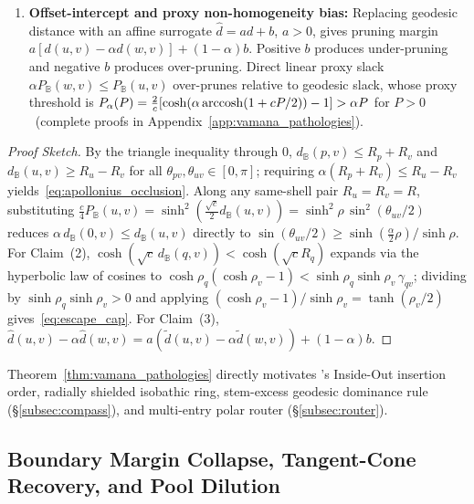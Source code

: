 \begin{theorem}
\begin{enumerate}
  \item \textbf{Offset-intercept and proxy non-homogeneity bias:}
  Replacing geodesic distance with an affine surrogate $\hat{d}=a d+b$, $a>0$, gives pruning margin $a[d(u,v)-\alpha d(w,v)]+(1-\alpha)b$. Positive $b$ produces under-pruning and negative $b$ produces over-pruning. Direct linear proxy slack $\alpha P_{\mathbb{B}}(w,v)\le P_{\mathbb{B}}(u,v)$ over-prunes relative to geodesic slack, whose proxy threshold is $P_\alpha(P)=\frac{2}{c}[\cosh(\alpha\operatorname{arccosh}(1+cP/2))-1]>\alpha P$ for $P>0$\ifpreprint\ (complete proofs in Appendix~\ref{app:vamana_pathologies})\fi.
\end{enumerate}
\end{theorem}

\begin{proof}[Proof Sketch]
By the triangle inequality through $0$, $d_{\mathbb{B}}(p, v) \le R_p + R_v$ and $d_{\mathbb{B}}(u, v) \ge R_u - R_v$ for all $\theta_{pv}, \theta_{uv} \in [0, \pi]$; requiring $\alpha(R_p + R_v) \le R_u - R_v$ yields~\eqref{eq:apollonius_occlusion}.
Along any same-shell pair $R_u = R_v = R$, substituting $\frac{c}{4}P_{\mathbb{B}}(u, v) = \sinh^2(\frac{\sqrt{c}}{2}d_{\mathbb{B}}(u, v)) = \sinh^2\rho\,\sin^2(\theta_{uv}/2)$ reduces $\alpha\,d_{\mathbb{B}}(0, v) \le d_{\mathbb{B}}(u, v)$ directly to $\sin(\theta_{uv}/2) \ge \sinh(\frac{\alpha}{2}\rho)/\sinh\rho$.
For Claim~(2), $\cosh(\sqrt{c}\,d_{\mathbb{B}}(q, v)) < \cosh(\sqrt{c}R_q)$ expands via the hyperbolic law of cosines to $\cosh\rho_q(\cosh\rho_v - 1) < \sinh\rho_q\sinh\rho_v\,\gamma_{qv}$; dividing by $\sinh\rho_q\sinh\rho_v > 0$ and applying $(\cosh\rho_v - 1)/\sinh\rho_v = \tanh(\rho_v/2)$ gives~\eqref{eq:escape_cap}.
For Claim~(3), $\hat{d}(u, v) - \alpha\hat{d}(w, v) = a(\tilde{d}(u, v) - \alpha\tilde{d}(w, v)) + (1 - \alpha)b$.
\end{proof}

Theorem~\ref{thm:vamana_pathologies} directly motivates \rquiver{}'s Inside-Out insertion order, radially shielded isobathic ring, stem-excess geodesic dominance rule (\S\ref{subsec:compass}), and multi-entry polar router (\S\ref{subsec:router}).

\subsection{Boundary Margin Collapse, Tangent-Cone Recovery, and Pool Dilution}
\label{subsec:tangent_cone}

